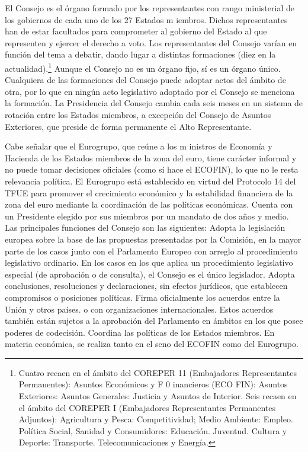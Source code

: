 \documentclass[10pt,a4paper]{article}
\begin{document}
El Consejo es el órgano formado por los representantes con rango ministerial de los gobiernos de cada uno de los 27 Estados m iembros. Dichos representantes han de estar facultados para comprometer al gobierno del Estado al que representen y ejercer el derecho a voto. Los representantes del Consejo varían en función del tema a debatir, dando lugar a distintas formaciones (diez en la actualidad).\footnote{
Cuatro recaen en el ámbito del COREPER 11 (Embajadores Representantes Permanentes): Asuntos Económicos y F 0 inancieros (ECO FIN): Asuntos Exteriores: Asuntos Generales: Justicia y Asuntos de Interior. Seis recaen en el ámbito del COREPER I (Embajadores Representantes Permanentes Adjuntos): Agricultura y Pesca: Competitividad; Medio Ambiente: Empleo. Política Social, Sanidad y Consumidores: Educación. Juventud. Cultura y Deporte: Transporte. Telecomunicaciones y Energía.
} Aunque el Consejo no es un órgano fijo, sí es un órgano único. Cualquiera de las formaciones del Consejo puede adoptar actos del ámbito de otra, por lo que en ningún acto legislativo adoptado por el Consejo se menciona la formación. La Presidencia del Consejo cambia cada seis meses en un sistema de rotación entre los Estados miembros, a excepción del Consejo de Asuntos Exteriores, que preside de forma permanente el Alto Representante.

Cabe señalar que el Eurogrupo, que reúne a los m inistros de Economía y Hacienda de los Estados miembros de la zona del euro, tiene carácter informal y no puede tomar decisiones oficiales (como sí hace el ECOFIN), lo que no le resta relevancia política. El Eurogrupo está establecido en virtud del Protocolo 14 del TFUE para promover el crecimiento económico y la estabilidad financiera de la zona del euro mediante la coordinación de las políticas económicas. Cuenta con un Presidente elegido por sus miembros por un mandato de dos años y medio. Las principales funciones del Consejo son las siguientes:
Adopta la legislación europea sobre la base de las propuestas presentadas por la Comisión, en la mayor parte de los casos junto con el Parlamento Europeo con arreglo al procedimiento legislativo ordinario. En los casos en los que aplica un procedimiento legislativo especial (de aprobación o de consulta), el Consejo es el único legislador.
Adopta conclusiones, resoluciones y declaraciones, sin efectos jurídicos, que establecen compromisos o posiciones políticas.
Firma oficialmente los acuerdos entre la Unión y otros países. o con organizaciones internacionales. Estos acuerdos también están sujetos a la aprobación del Parlamento en ámbitos en los que posee poderes de codecisión. 
Coordina las políticas de los Estados miembros. En materia económica, se realiza tanto en el seno del ECOFIN como del Eurogrupo.
\end{document}
